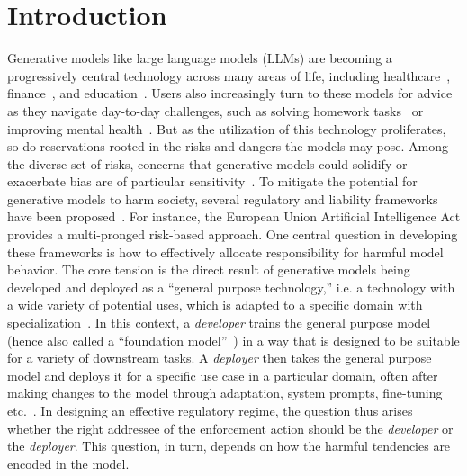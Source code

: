 \section{Introduction}
Generative models like large language models (LLMs) are becoming a progressively central technology across many areas of life, including healthcare~\cite{singhal2025toward, mansoor2024evaluating}, finance~\cite{kim2024financial, zhao2024revolutionizing}, and education~\cite{bewersdorff2025taking, cain2024prompting}. Users also increasingly turn to these models for advice as they navigate day-to-day challenges, such as solving homework tasks~\cite{pew2025chatgpt} or improving mental health~\cite{lemonde2024ai}. But as the utilization of this technology proliferates, so do reservations rooted in the risks and dangers the models may pose. Among the diverse set of risks, concerns that generative models could solidify or exacerbate bias are of particular sensitivity~\cite{ferrara2023fairness, gautam2024melting, hacker2024generative, Xiang_2024}. To mitigate the potential for generative models to harm society, several regulatory and liability frameworks have been proposed~\cite{eu2021aiact,whitehouse2023ai}. For instance, the European Union Artificial Intelligence Act provides a multi-pronged risk-based approach. One central question in developing these frameworks is how to effectively allocate responsibility for harmful model behavior. The core tension is the direct result of generative models being developed and deployed as a ``general purpose technology,'' i.e. a technology with a wide variety of potential uses, which is adapted to a specific domain with specialization~\cite{bresnahan2010general}.
In this context, a \textit{developer} trains the general purpose model (hence also called a ``foundation model''~\cite{bommasani2021opportunities}) in a way that is designed to be suitable for a variety of downstream tasks. A \textit{deployer} then takes the general purpose model and deploys it for a specific use case in a particular domain, often after making changes to the model through adaptation, system prompts, fine-tuning etc.~\cite{laufer2024fine, xu2024economics, chen2024overview}.
In designing an effective regulatory regime, the question thus arises whether the right addressee of the enforcement action should be the \textit{developer} or the \textit{deployer}. This question, in turn, depends on how the harmful tendencies are encoded in the model. 

